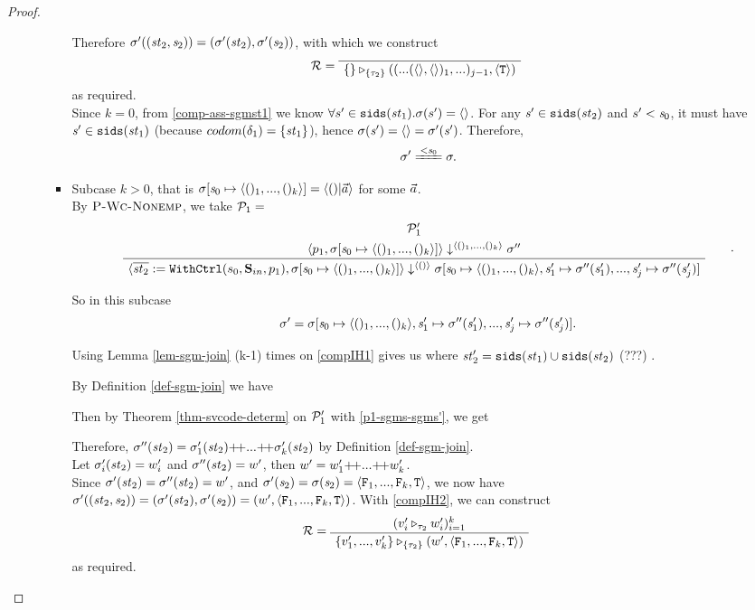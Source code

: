 \begin{proof}
\begin{itemize}
\begin{enumerate}[(i)]
\begin{itemize}
	Therefore $\sigma'((\mathit{st}_2,\mathit{s}_2)) = (\sigma'(\mathit{st}_2), \sigma'(\mathit{s}_2))$, with which we construct 
	$$\MR = 
	\PT{\Axiom{\ValRep{\{\}}{\tseq{\tau_2}}{((...(\emptyv,\emptyv)_1,...)_{j-1},\oT)}}}$$ 
	as required.\\
    
    Since $k=0$, from \eqref{comp-ass-sgmst1} we know $\forall s' \in \mathtt{sids}(\mathit{st}_1). \sigma(s') = \langle \rangle$. 
    For any $\mathit{s}' \in \mathtt{sids}(\mathit{st}_2)$ and $s' < \mathit{s}_0$, it must have $\mathit{s}' \in \mathtt{sids}(\mathit{st}_1)$ 
    (because $codom(\delta_1) = \{\mathit{st}_1\}$), hence $\sigma(\mathit{s}') = \langle \rangle = \sigma'(\mathit{s}')$. 
    Therefore, $$\sgm' \ConEq{\s_0} \sgm.$$
    

\def\sgmp-nonempty{\sgm[\s_0 \|-> \kunit, \s_1' \|-> \sgm''(\s'_1),...,
	\s'_j \|-> \sgm''(\s'_j)]}  

	\item \label{subcase-2} 
	Subcase $k > 0$, that is $\sgmsz = \< ()|\a \'>$ for some $\vec a$. \\
	By $\textsc{P-Wc-Nonemp}$, we take $\mathcal{P}_1 = $
	$$\PT{
		\UCN{\MP_1'}{\seval{p_1}{\sgmsz}{\kunit}{\sgm''}}
		\UC{\seval{\withctrl {s_0} {p_1} {\Sin}{\overline{\st_2}} } 
				  {\sgmsz} 
				  {\vunit} 
				  {\sgmp-nonempty}}
	}.$$
	
	So in this subcase $$\sgm' = \sgmp-nonempty.$$
	
	Using Lemma \ref{lem-sgm-join} (k-1) times on \eqref{compIH1} gives us
	where $\mathit{st}_2' = \mathtt{sids}(\mathit{st}_1) \cup \mathtt{sids}(\mathit{st}_2)$ (???) . 
	
	By Definition \ref{def-sgm-join} we have
	
	Then by Theorem \ref{thm-svcode-determ} on $\mathcal{P}_1'$ with \eqref{p1-sgms-sgms'}, we get
	
	Therefore, $\sgm''(\st_2) = \sgm'_1(\st_2) {\++} ... {\++} \sgm'_k(\st_2)$ by Definition \ref{def-sgm-join}.\\
	Let $\sigma'_i(\mathit{st}_2) = w'_i$ and  $\sigma''(\mathit{st}_2) = w'$, then
	$w' = w'_1 {\++} ... {\++} w'_k$. \\
	
	Since $\sigma'(\mathit{st}_2) = \sigma''(\mathit{st}_2) = w'$, and $\sgm'(\s_2) = \sgm(\s_2) = \stwo$,
	we now have $\sgm'((\st_2,\s_2)) = (\sgm'(\st_2),\sgm'(\s_2)) = (w',\stwo)$. 
	With \eqref{compIH2}, we can construct
	$$\MR = 
	\PT{
		\AC{(\ValRep{v'_i}{\tau_2}{w'_i})^k_{i=1}}
		\UC{\ValRep{\Seqk{v'}}{\tseq{\tau_2}}{(w',\stwo)}}
	}$$ as required. \\


\end{itemize}
\end{enumerate}
\end{itemize}
\end{proof}
